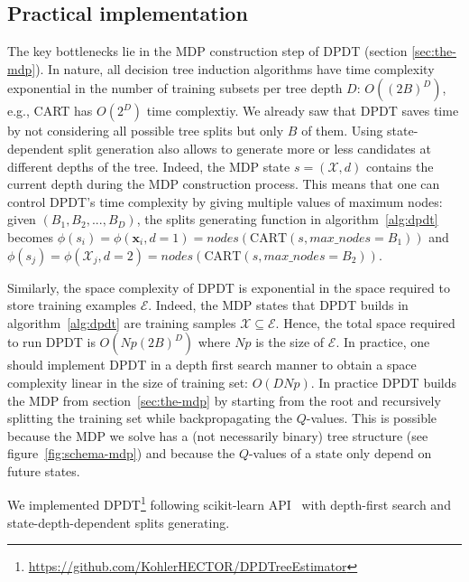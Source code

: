 \subsection{Practical implementation}

The key bottlenecks lie in the MDP construction step of DPDT (section \ref{sec:the-mdp}). In nature, all decision tree induction algorithms have time complexity exponential in the number of training subsets per tree depth $D$: $O((2B)^D)$, e.g., CART has $O(2^D)$ time complextiy. We already saw that DPDT saves time by not considering all possible tree splits but only $B$ of them. Using state-dependent split generation also allows to generate more or less candidates at different depths of the tree. Indeed, the MDP state $s = (\mathcal{X},d)$ contains the current depth during the MDP construction process. This means that one can control DPDT's time complexity by giving multiple values of maximum nodes: given $(B_1, B_2, ..., B_D)$, the splits generating function in algorithm~\ref{alg:dpdt} becomes $\phi(s_i) = \phi(\boldsymbol{x}_i, d=1) = nodes(\text{CART}(s, max\_nodes=B_1))$ and  $\phi(s_j) = \phi(\mathcal{X}_j, d=2) = nodes(\text{CART}(s, max\_nodes=B_2))$.

Similarly, the space complexity of DPDT is exponential in the space required to store training examples $\mathcal E$. Indeed, the MDP states that DPDT builds in algorithm~\ref{alg:dpdt} are training samples $\mathcal X \subseteq \mathcal E$. Hence, the total space required to run DPDT is $O({Np}(2B)^{D})$ where $Np$ is the size of $\mathcal{E}$. In practice, one should implement DPDT in a depth first search manner to obtain a space complexity linear in the size of training set: $O(DNp)$. In practice DPDT builds the MDP from section~\ref{sec:the-mdp} by starting from the root and recursively splitting the training set while backpropagating the $Q$-values. This is possible because the MDP we solve has a (not necessarily binary) tree structure (see figure~\ref{fig:schema-mdp}) and because the $Q$-values of a state only depend on future states. 

We implemented DPDT\footnote{\url{https://github.com/KohlerHECTOR/DPDTreeEstimator}} following scikit-learn API~\cite{sklearn_api} with depth-first search and state-depth-dependent splits generating. 